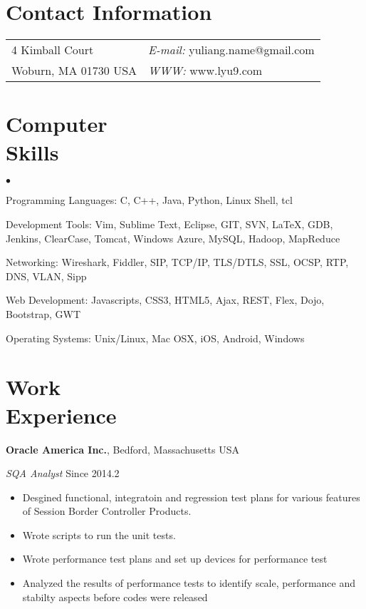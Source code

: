 \documentclass[margin,line]{res}
\newenvironment{list2}{
  \begin{list}{$\bullet$}{%
      \setlength{\itemsep}{0in}
      \setlength{\parsep}{0in} \setlength{\parskip}{0in}
      \setlength{\topsep}{0in} \setlength{\partopsep}{0in} 
      \setlength{\leftmargin}{0.2in}}}{\end{list}}
\begin{document}

\begin{resume}
\section{\sc Contact Information}
\vspace{.05in}
\begin{tabular}{@{}p{2in}p{4in}}  
4 Kimball Court & {\it E-mail:}  yuliang.name@gmail.com \\       
Woburn, MA 01730 USA  & {\it WWW:} www.lyu9.com \\     
\end{tabular}

\section{\sc Computer\\Skills} 
\begin{list2}
\item Programming Languages: C, C++, Java, Python, Linux Shell, tcl
\item Development Tools: Vim, Sublime Text, Eclipse, GIT, SVN, \LaTeX, 
                         GDB, Jenkins, ClearCase, Tomcat, Windows Azure, 
                         MySQL, Hadoop, MapReduce
\item Networking: Wireshark, Fiddler, SIP, TCP/IP, TLS/DTLS, 
                  SSL, OCSP, RTP, DNS, VLAN, Sipp
\item Web Development: Javascripts, CSS3, HTML5, Ajax, 
                       REST, Flex, Dojo, Bootstrap, GWT
\item Operating Systems:  Unix/Linux, Mac OSX, iOS, Android, Windows\\
\end{list2}

\section{\sc Work\\Experience}
{\bf Oracle America Inc.}, Bedford, Massachusetts USA

\vspace{-.3cm}
{\em SQA Analyst} \hfill {Since 2014.2}\\
\begin{itemize}
\item Desgined functional, integratoin and regression test plans for various features
of Session Border Controller Products.
\item Wrote scripts to run the unit tests.
\item Wrote performance test plans and set up devices for performance test
\item Analyzed the results of performance tests to identify scale, performance and 
stabilty aspects before codes were released
\end{itemize}


\end{resume}
\end{document}
